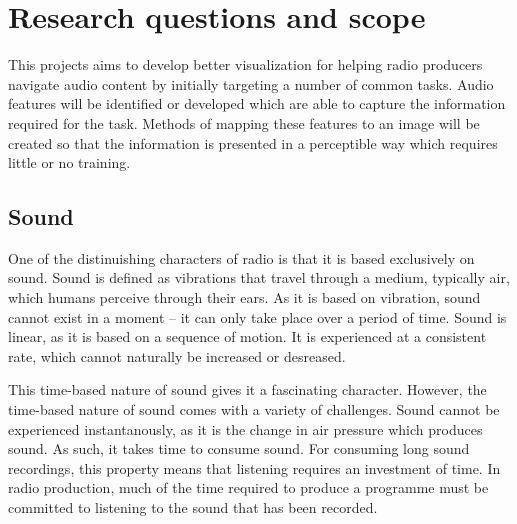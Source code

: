 \section{Research questions and scope}\label{sec:intro-questions}
This projects aims to develop better visualization for helping radio producers
navigate audio content by initially targeting a number of common tasks. Audio
features will be identified or developed which are able to capture the
information required for the task. Methods of mapping these features to an
image will be created so that the information is presented in a perceptible way
which requires little or no training. 

\subsection{Sound}


One of the distinuishing characters of radio is that it is based exclusively on sound.
Sound is defined as vibrations that travel through a medium, typically air, which humans perceive through their ears.
As it is based on vibration, sound cannot exist in a moment -- it can only take place over a period of time.
Sound is linear, as it is based on a sequence of motion.
It is experienced at a consistent rate, which cannot naturally be increased or desreased.

This time-based nature of sound gives it a fascinating character.
However, the time-based nature of sound comes with a variety of challenges.
Sound cannot be experienced instantanously, as it is the change in air pressure which produces sound.
As such, it takes time to consume sound.
For consuming long sound recordings, this property means that listening requires an investment of time.
In radio production, much of the time required to produce a programme must be committed to listening to the sound that has been recorded.

